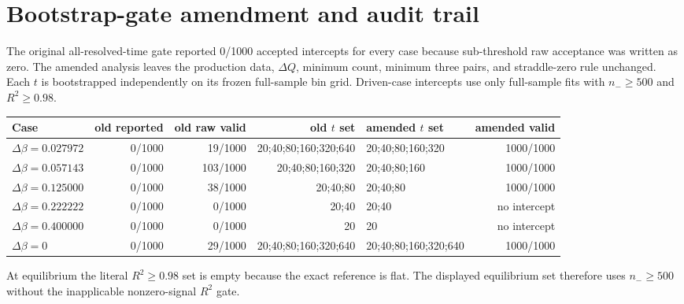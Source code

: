 \documentclass[10pt]{article}
\begin{document}
\section*{Bootstrap-gate amendment and audit trail}
The original all-resolved-time gate reported 0/1000 accepted intercepts for every case because sub-threshold raw acceptance was written as zero.  The amended analysis leaves the production data, $\Delta Q$, minimum count, minimum three pairs, and straddle-zero rule unchanged.  Each $t$ is bootstrapped independently on its frozen full-sample bin grid.  Driven-case intercepts use only full-sample fits with $n_-\ge500$ and $R^2\ge0.98$.
\begin{longtable}{lrrrlr}
\toprule Case & old reported & old raw valid & old $t$ set & amended $t$ set & amended valid \\
\midrule\endhead
$\Delta\beta=0.027972$ & 0/1000 & 19/1000 & 20;40;80;160;320;640 & 20;40;80;160;320 & 1000/1000 \\
$\Delta\beta=0.057143$ & 0/1000 & 103/1000 & 20;40;80;160;320 & 20;40;80;160 & 1000/1000 \\
$\Delta\beta=0.125000$ & 0/1000 & 38/1000 & 20;40;80 & 20;40;80 & 1000/1000 \\
$\Delta\beta=0.222222$ & 0/1000 & 0/1000 & 20;40 & 20;40 & no intercept \\
$\Delta\beta=0.400000$ & 0/1000 & 0/1000 & 20 & 20 & no intercept \\
$\Delta\beta=0$ & 0/1000 & 29/1000 & 20;40;80;160;320;640 & 20;40;80;160;320;640 & 1000/1000 \\
\bottomrule\end{longtable}
At equilibrium the literal $R^2\ge0.98$ set is empty because the exact reference is flat.  The displayed equilibrium set therefore uses $n_-\ge500$ without the inapplicable nonzero-signal $R^2$ gate.
\end{document}
